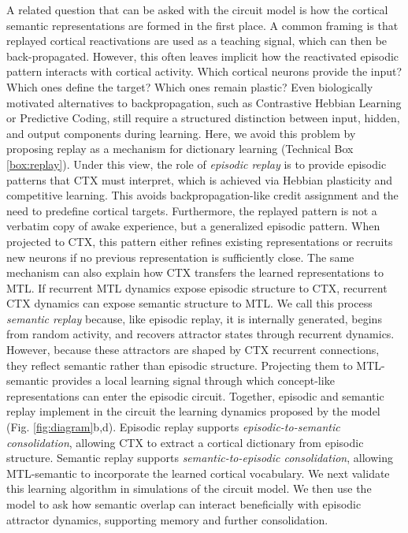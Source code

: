 \documentclass{article}
\begin{document}
\newline\newline
A related question that can be asked with the circuit model is how the cortical semantic representations are formed in the first place. A common framing is that replayed cortical reactivations are used as a teaching signal, which can then be back-propagated. However, this often leaves implicit how the reactivated episodic pattern interacts with cortical activity. Which cortical neurons provide the input? Which ones define the target? Which ones remain plastic? Even biologically motivated alternatives to backpropagation, such as Contrastive Hebbian Learning or Predictive Coding, still require a structured distinction between input, hidden, and output components during learning.
\newline\newline
Here, we avoid this problem by proposing replay as a mechanism for dictionary learning (Technical Box \ref{box:replay}). Under this view, the role of \textit{episodic replay} is to provide episodic patterns that CTX must interpret, which is achieved via Hebbian plasticity and competitive learning. This avoids backpropagation-like credit assignment and the need to predefine cortical targets. Furthermore, the replayed pattern is not a verbatim copy of awake experience, but a generalized episodic pattern. When projected to CTX, this pattern either refines existing representations or recruits new neurons if no previous representation is sufficiently close.
\newline\newline
The same mechanism can also explain how CTX transfers the learned representations to MTL. If recurrent MTL dynamics expose episodic structure to CTX, recurrent CTX dynamics can expose semantic structure to MTL. We call this process \textit{semantic replay} because, like episodic replay, it is internally generated, begins from random activity, and recovers attractor states through recurrent dynamics. However, because these attractors are shaped by CTX recurrent connections, they reflect semantic rather than episodic structure. Projecting them to MTL-semantic provides a local learning signal through which concept-like representations can enter the episodic circuit.
\newline\newline
Together, episodic and semantic replay implement in the circuit the learning dynamics proposed by the model (Fig. \ref{fig:diagram}b,d). Episodic replay supports \textit{episodic-to-semantic consolidation}, allowing CTX to extract a cortical dictionary from episodic structure. Semantic replay supports \textit{semantic-to-episodic consolidation}, allowing MTL-semantic to incorporate the learned cortical vocabulary. We next validate this learning algorithm in simulations of the circuit model. We then use the model to ask how semantic overlap can interact beneficially with episodic attractor dynamics, supporting memory and further consolidation.
\end{document}
